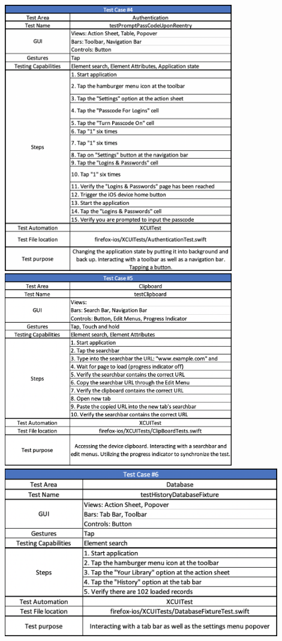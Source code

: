 \includegraphics[width=10cm]{img/tc4.png} \\[2mm]
\includegraphics[width=10cm]{img/tc5.png} \\[2mm]
\includegraphics[width=12cm]{img/tc6.png} \\[2mm]
